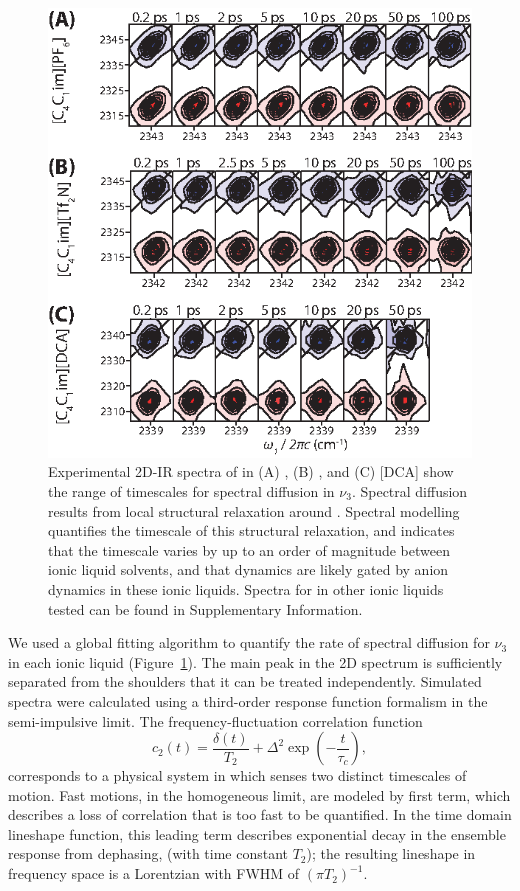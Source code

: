 {\begin{figure}
  \centering
  \includegraphics[scale=1.40]{./paper_01/fig7.eps}
  \caption[Experimental 2D-IR spectra of  in \ce{[Im_{4,1}][X]}]{\label{fig:all 2D}Experimental 2D-IR spectra of  in \ce{[Im_{4,1}]} (A) \ce{[PF6]}, (B) \ce{[Tf2N]}, and (C) [DCA] show the range of timescales for spectral diffusion in \(\nu_3\). Spectral diffusion results from local structural relaxation around . Spectral modelling quantifies the timescale of this structural relaxation, and indicates that the timescale varies by up to an order of magnitude between ionic liquid solvents, and that  dynamics are likely gated by anion dynamics in these ionic liquids. Spectra for  in other ionic liquids tested can be found in Supplementary Information.}
\end{figure}

We used a global fitting algorithm to quantify the rate of spectral diffusion for \(\nu_3\) in each ionic liquid (Figure~\ref{fig:all 2D}). The main peak in the 2D spectrum is sufficiently separated from the shoulders that it can be treated independently. Simulated spectra were calculated using a third-order response function formalism in the semi-impulsive limit. The frequency-fluctuation correlation function
\begin{equation}
  \label{eq:c2}
  c_{2}(t) = \frac{\delta(t)}{T_2} + \Delta^2 \exp \left( -\frac{t}{\tau_c} \right),
\end{equation}
corresponds to a physical system in which  senses two distinct timescales of motion. Fast motions, in the homogeneous limit, are modeled by first term, which describes a loss of correlation that is too fast to be quantified. In the time domain lineshape function, this leading term describes exponential decay in the ensemble response from dephasing, (with time constant \(T_2\)); the resulting lineshape in frequency space is a Lorentzian with FWHM of \(\left( \pi T_{2} \right)^{-1}\).

}
